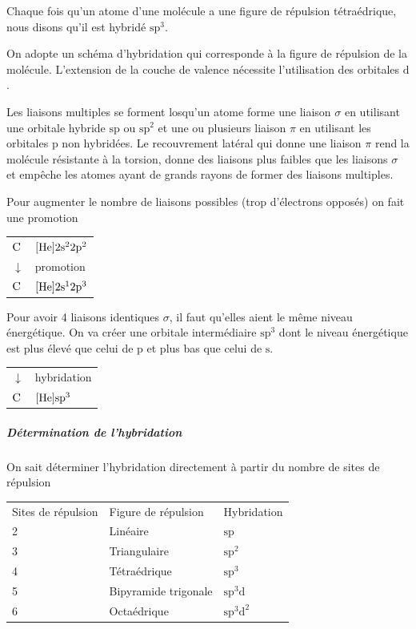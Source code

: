 \documentclass[11pt,a4paper,french]{article}
\newcommand\sorb{\mathrm{s}}
\newcommand\porb{\mathrm{p}}
\newcommand\dorb{\mathrm{d}}
\begin{document}
Chaque fois qu'un atome d'une molécule a une figure de répulsion tétraédrique, nous disons qu'il est hybridé $\sorb\porb^3$.

On adopte un schéma d'hybridation qui corresponde à la figure de répulsion de la molécule.
L'extension de la couche de valence nécessite l'utilisation des orbitales $\dorb$.

Les liaisons multiples se forment losqu'un atome forme une liaison $\sigma$ en utilisant une orbitale hybride $\sorb\porb$ ou $\sorb\porb^2$ et une ou plusieurs liaison $\pi$ en utilisant les orbitales $\porb$ non hybridées.
Le recouvrement latéral qui donne une liaison $\pi$ rend la molécule résistante à la torsion, donne des liaisons plus faibles que les liaisons $\sigma$ et empêche les atomes ayant de grands rayons de former des liaisons multiples.


Pour augmenter le nombre de liaisons possibles (trop d'électrons opposés) on fait une promotion
\begin{center}
	\begin{tabular}{ll}
		$\ce{C}$ & $[\ce{He}]2\sorb^22\porb^2$\\
		$\downarrow$ &  promotion\\
		$\ce{C}$ & $[\ce{He}]2\sorb^12\porb^3$
	\end{tabular}
\end{center}

Pour avoir 4 liaisons identiques $\sigma$, %
il faut qu'elles aient le même niveau énergétique.
On va créer une orbitale intermédiaire $\sorb\porb^3$ dont le niveau énergétique est plus élevé que celui de $\porb$ et plus bas que celui de $\sorb$.

\begin{center}
	\begin{tabular}{ll}
		$\downarrow$ &  hybridation\\
		$\ce{C}$ & $[\ce{He}]\sorb\porb^3$
	\end{tabular}
\end{center}

\subparagraph{Détermination de l'hybridation}
On sait déterminer l'hybridation directement à partir du nombre de sites de répulsion

\begin{center}
	\begin{tabular}{lll}
		Sites de répulsion & Figure de répulsion & Hybridation\\
		2 & Linéaire & $\sorb\porb$\\
		3 & Triangulaire & $\sorb\porb^2$\\
		4 & Tétraédrique & $\sorb\porb^3$\\
		5 & Bipyramide trigonale & $\sorb\porb^3\dorb$\\
		6 & Octaédrique & $\sorb\porb^3\dorb^2$\\
	\end{tabular}
\end{center}
\end{document}
